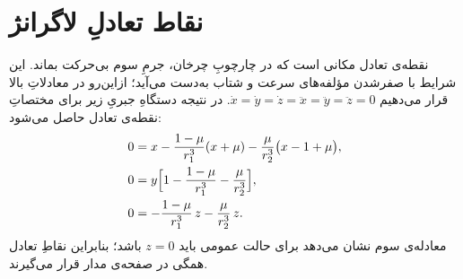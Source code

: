 %
%
%
%
%
%
%
%
%
%
%
%









\section{نقاط تعادلِ لاگرانژ}\label{sec:lag-points}

نقطه‌ی تعادل مکانی است که در چارچوبِ چرخان، جرمِ سوم بی‌حرکت بماند. این شرایط با صفرشدن مؤلفه‌های سرعت و شتاب به‌دست می‌آید؛ ازاین‌رو در معادلاتِ بالا قرار می‌دهیم $\dot x=\dot y=\dot z=\ddot x=\ddot y=\ddot z=0$. در نتیجه دستگاهِ جبریِ زیر برای مختصاتِ نقطه‌ی تعادل حاصل می‌شود:
\begin{align}
	0 &= x-\frac{1-\mu}{r_{1}^{3}}(x+\mu)-\frac{\mu}{r_{2}^{3}}\bigl(x-1+\mu\bigr),\\
	0 &= y\Bigl[1-\frac{1-\mu}{r_{1}^{3}}-\frac{\mu}{r_{2}^{3}}\Bigr],\\
	0 &= -\frac{1-\mu}{r_{1}^{3}}\,z-\frac{\mu}{r_{2}^{3}}\,z.
\end{align}
معادله‌ی سوم نشان می‌دهد برای حالت عمومی باید $z=0$ باشد؛ بنابراین نقاطِ تعادل همگی در صفحه‌ی مدار قرار می‌گیرند.

